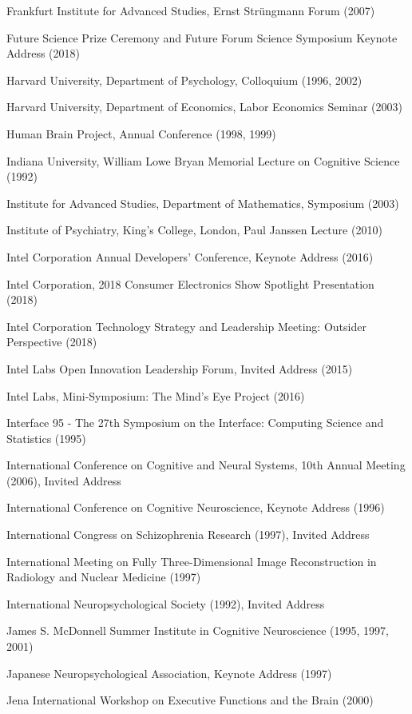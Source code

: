 \documentclass[10 pt]{article}
\begin{document}
Frankfurt Institute for Advanced Studies, Ernst Strüngmann Forum (2007)

Future Science Prize Ceremony and Future Forum Science Symposium Keynote Address (2018)

Harvard University, Department of Psychology, Colloquium (1996, 2002)

Harvard University, Department of Economics, Labor Economics Seminar (2003)

Human Brain Project, Annual Conference (1998, 1999)

Indiana University, William Lowe Bryan Memorial Lecture on Cognitive Science (1992)

Institute for Advanced Studies, Department of Mathematics, Symposium (2003)

Institute of Psychiatry, King’s College, London, Paul Janssen Lecture (2010)

Intel Corporation Annual Developers’ Conference, Keynote Address (2016)

Intel Corporation, 2018 Consumer Electronics Show Spotlight Presentation (2018)

Intel Corporation Technology Strategy and Leadership Meeting: Outsider Perspective (2018)

Intel Labs Open Innovation Leadership Forum, Invited Address (2015)

Intel Labs, Mini-Symposium: The Mind’s Eye Project (2016)

Interface 95 - The 27th Symposium on the Interface: Computing Science and Statistics (1995)

International Conference on Cognitive and Neural Systems, 10th Annual Meeting (2006), Invited Address

International Conference on Cognitive Neuroscience, Keynote Address (1996)

International Congress on Schizophrenia Research (1997), Invited Address

International Meeting on Fully Three-Dimensional Image Reconstruction in Radiology and Nuclear Medicine (1997)

International Neuropsychological Society (1992), Invited Address

James S. McDonnell Summer Institute in Cognitive Neuroscience (1995, 1997, 2001)

Japanese Neuropsychological Association, Keynote Address (1997)

Jena International Workshop on Executive Functions and the Brain (2000)
\end{document}
